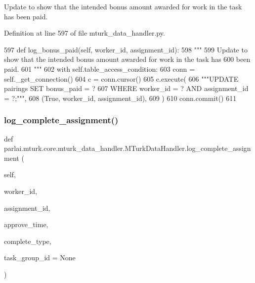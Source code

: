 \begin{DoxyVerb}Update to show that the intended bonus amount awarded for work in the task has
been paid.
\end{DoxyVerb}
 

Definition at line 597 of file mturk\+\_\+data\+\_\+handler.\+py.


\begin{DoxyCode}
597     \textcolor{keyword}{def }log\_bonus\_paid(self, worker\_id, assignment\_id):
598         \textcolor{stringliteral}{"""}
599 \textcolor{stringliteral}{        Update to show that the intended bonus amount awarded for work in the task has}
600 \textcolor{stringliteral}{        been paid.}
601 \textcolor{stringliteral}{        """}
602         with self.table\_access\_condition:
603             conn = self.\_get\_connection()
604             c = conn.cursor()
605             c.execute(
606                 \textcolor{stringliteral}{"""UPDATE pairings SET bonus\_paid = ?}
607 \textcolor{stringliteral}{                         WHERE worker\_id = ? AND assignment\_id = ?;"""},
608                 (\textcolor{keyword}{True}, worker\_id, assignment\_id),
609             )
610             conn.commit()
611 
\end{DoxyCode}
\mbox{\label{classparlai_1_1mturk_1_1core_1_1mturk__data__handler_1_1MTurkDataHandler_a78a1aacc3cce8b8afd0153ad68c09baf}} 
\subsubsection{\texorpdfstring{log\+\_\+complete\+\_\+assignment()}{log\_complete\_assignment()}}
{\footnotesize\ttfamily def parlai.\+mturk.\+core.\+mturk\+\_\+data\+\_\+handler.\+M\+Turk\+Data\+Handler.\+log\+\_\+complete\+\_\+assignment (\begin{DoxyParamCaption}\item[{}]{self,  }\item[{}]{worker\+\_\+id,  }\item[{}]{assignment\+\_\+id,  }\item[{}]{approve\+\_\+time,  }\item[{}]{complete\+\_\+type,  }\item[{}]{task\+\_\+group\+\_\+id = {\ttfamily None} }\end{DoxyParamCaption})}

